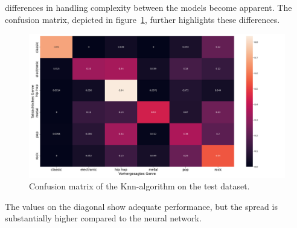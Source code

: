 \documentclass[
  12pt,
  bibliography=totoc,     %
  captions=tableheading,  %
  titlepage=firstiscover, %
]{scrartcl}
\begin{document}
differences in handling complexity between the models become apparent.
The confusion matrix, depicted in figure~\ref{fig:conf_knn}, further highlights these differences.
\begin{figure}[H]
  \centering
  \includegraphics[scale=0.3]{figures/knn/confusion_matrix_knn.png}
  \caption{Confusion matrix of the Knn-algorithm on the test dataset.}
  \label{fig:conf_knn}
\end{figure}
\noindent
The values on the diagonal show adequate performance, but the spread is substantially higher compared to the neural network.
\end{document}
